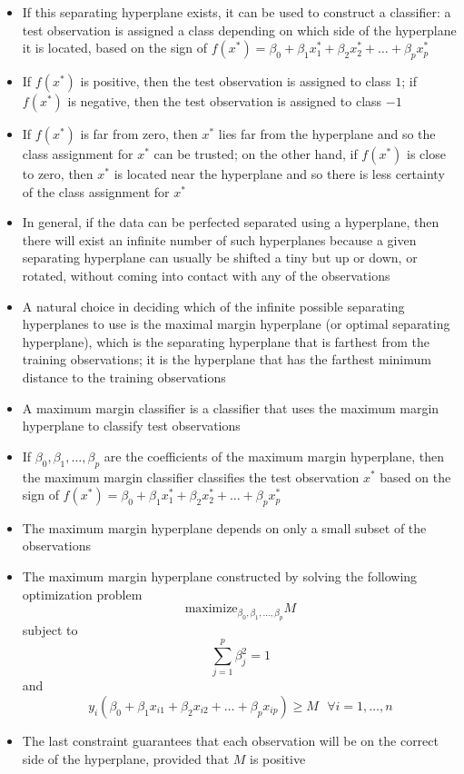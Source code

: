 \documentclass[12pt]{article}
\begin{document}
\begin{itemize}
\item If this separating hyperplane exists, it can be used to construct a classifier: a test observation is assigned a class depending on which side of the hyperplane it is located, based on the sign of $f(x^\ast) = \beta_0 + \beta_1x_1^\ast + \beta_2x_2^\ast + \dots + \beta_px_p^\ast$
\item If $f(x^\ast)$ is positive, then the test observation is assigned to class $1$; if $f(x^\ast)$ is negative, then the test observation is assigned to class $-1$ 
\item If $f(x^\ast)$ is far from zero, then $x^\ast$ lies far from the hyperplane and so the class assignment for $x^\ast$ can be trusted; on the other hand, if $f(x^\ast)$ is close to zero, then $x^\ast$ is located near the hyperplane and so there is less certainty of the class assignment for $x^\ast$ 
\item In general, if the data can be perfected separated using a hyperplane, then there will exist an infinite number of such hyperplanes because a given separating hyperplane can usually be shifted a tiny but up or down, or rotated, without coming into contact with any of the observations 
\item A natural choice in deciding which of the infinite possible separating hyperplanes to use is the maximal margin hyperplane (or optimal separating hyperplane), which is the separating hyperplane that is farthest from the training observations; it is the hyperplane that has the farthest minimum distance to the training observations 
\item A maximum margin classifier is a classifier that uses the maximum margin hyperplane to classify test observations 
\item If $\beta_0,\beta_1,\dots,\beta_p$ are the coefficients of the maximum margin hyperplane, then the maximum margin classifier classifies the test observation $x^\ast$ based on the sign of $f(x^\ast) = \beta_0 + \beta_1x_1^\ast + \beta_2x_2^\ast + \dots + \beta_px_p^\ast$ 
\item The maximum margin hyperplane depends on only a small subset of the observations 
\item The maximum margin hyperplane constructed by solving the following optimization problem
$$ \text{maximize}_{\beta_0, \beta_1,\dots,\beta_p} M $$ subject to $$ \sum_{j=1}^p \beta_j^2 = 1 $$ and $$ y_i(\beta_0 + \beta_1x_{i1} + \beta_2x_{i2} + \dots + \beta_px_{ip}) \geq M ~~~ \forall i = 1,\dots,n $$ 
\item The last constraint guarantees that each observation will be on the correct side of the hyperplane, provided that $M$ is positive 

\end{itemize}
\end{document}
